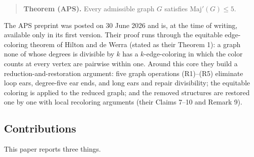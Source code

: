 \documentclass[11pt]{article}
\theoremstyle{definition}
\theoremstyle{remark}
\begin{document}
\begin{quote}
\textbf{Theorem (APS).} Every admissible graph \(G\) satisfies \(\mathrm{Maj}'(G) \le 5\).
\end{quote}

The APS preprint was posted on 30 June 2026 and is, at the time of writing, available only in its first version. Their proof runs through the equitable edge-coloring theorem of Hilton and de Werra \cite{HdW} (stated as their Theorem 1): a graph none of whose degrees is divisible by \(k\) has a \(k\)-edge-coloring in which the color counts at every vertex are pairwise within one. Around this core they build a reduction-and-restoration argument: five graph operations (R1)--(R5) eliminate loop ears, degree-five ear ends, and long ears and repair divisibility; the equitable coloring is applied to the reduced graph; and the removed structures are restored one by one with local recoloring arguments (their Claims 7--10 and Remark 9).

\subsection{Contributions}\label{13-contributions}

This paper reports three things.
\end{document}
